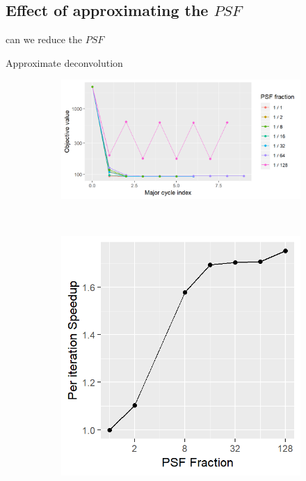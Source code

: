 \subsection{Effect of approximating the $PSF$} \label{results:gradients}
can we reduce the $PSF$

Approximate deconvolution
\begin{figure}[h]
	\centering
	\begin{subfigure}[b]{0.7\linewidth}
		\includegraphics[width=\linewidth]{./chapters/10.results/gradient/size.png}
	\end{subfigure}
	\\
	\begin{subfigure}[b]{0.35\linewidth}
		\includegraphics[width=\linewidth]{./chapters/10.results/gradient/speedup_iter.png}

\end{subfigure}
\end{figure}
